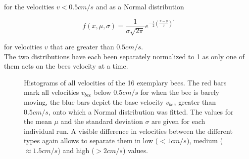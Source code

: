 for the velocities $v<0.5cm/s$ and as a Normal distribution 

\begin{equation}
\label{eq:Normal}
     f(x,\mu,\sigma) = \frac{1}{\sigma \sqrt{2\pi}} e^{-\frac {1}{2}\left(\frac {x-\mu }{\sigma }\right)^{2}}
\end{equation}

for velocities $v$ that are greater than $0.5cm/s$.
\\
The two distributions have each been separately normalized to 1 as only one of them acts on the bees velocity at a time.

\begin{figure}%
    \centering
    \caption{Histograms of all velocities of the 16 exemplary bees. The red bars mark all velocities $v_{bee}$ below $0.5cm/s$ for when the bee is barely moving, the blue bars depict the base velocity $v_{bee}$ greater than $0.5cm/s$, onto which a Normal distribution was fitted. The values for the mean $\mu$ and the standard deviation $\sigma$ are given for each individual run. A visible difference in velocities between the different types again allows to separate them in low ($<1cm/s$), medium ($\approx 1.5cm/s$) and high ($>2cm/s$) values.}
    \label{fig:Hist_velocity}
\end{figure}

